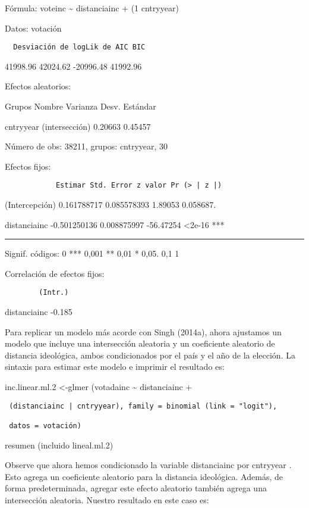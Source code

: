 \documentclass[
]{book}
\begin{document}
Fórmula: voteinc \textasciitilde{} distanciainc + (1 \textbar{} cntryyear)

Datos: votación

\begin{verbatim}
  Desviación de logLik de AIC BIC
\end{verbatim}

41998.96 42024.62 -20996.48 41992.96

Efectos aleatorios:

Grupos Nombre Varianza Desv. Estándar

cntryyear (intersección) 0.20663 0.45457

Número de obs: 38211, grupos: cntryyear, 30

Efectos fijos:

\begin{verbatim}
            Estimar Std. Error z valor Pr (> | z |)
\end{verbatim}

(Intercepción) 0.161788717 0.085578393 1.89053 0.058687.

distanciainc -0.501250136 0.008875997 -56.47254 \textless2e-16 ***

\begin{center}\rule{0.5\linewidth}{0.5pt}\end{center}

Signif. códigos: 0 *** 0,001 ** 0,01 * 0,05. 0,1 1

Correlación de efectos fijos:

\begin{verbatim}
        (Intr.)
\end{verbatim}

distanciainc -0.185

Para replicar un modelo más acorde con Singh (2014a), ahora ajustamos un modelo que incluye una intersección aleatoria y un coeficiente aleatorio de distancia ideológica, ambos condicionados por el país y el año de la elección. La sintaxis para estimar este modelo e imprimir el resultado es:

inc.linear.ml.2 \textless-glmer (votadainc \textasciitilde{} distanciainc +

\begin{verbatim}
 (distanciainc | cntryyear), family = binomial (link = "logit"),

 datos = votación)
\end{verbatim}

resumen (incluido lineal.ml.2)

Observe que ahora hemos condicionado la variable distanciainc por cntryyear . Esto agrega un coeficiente aleatorio para la distancia ideológica. Además, de forma predeterminada, agregar este efecto aleatorio también agrega una intersección aleatoria. Nuestro resultado en este caso es:
\end{document}
